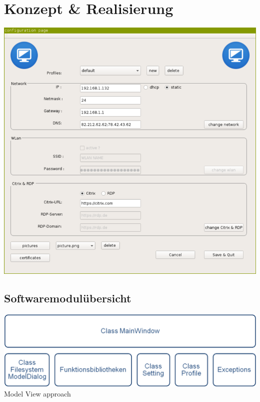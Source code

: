 \documentclass{beamer}
\begin{document}
\section{Konzept \& Realisierung}

	\begin{frame}
		\centering
		\includegraphics[scale=0.35]{ConfigPage}\\
	\end{frame}


\subsection{Softwaremodulübersicht}
    \begin{frame}
		\centering
			\includegraphics[width=\textwidth]{module.png}\\
			\vspace{3em}
			\Large Model View approach
	\end{frame}
	
\end{document}

